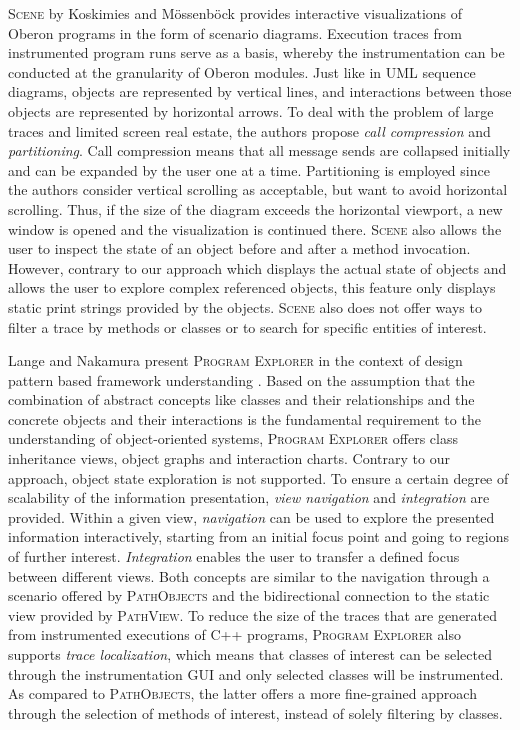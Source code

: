\textsc{Scene} by Koskimies and Mössenböck \cite{koskimies_scene:_1996} provides interactive visualizations of Oberon programs in the form of scenario diagrams.
Execution traces from instrumented program runs serve as a basis, whereby the instrumentation can be conducted at the granularity of Oberon modules.
Just like in UML sequence diagrams, objects are represented by vertical lines, and interactions between those objects are represented by horizontal arrows.
To deal with the problem of large traces and limited screen  real estate, the authors propose \emph{call compression} and \emph{partitioning}.
Call compression means that all message sends are collapsed initially and can be expanded by the user one at a time.
Partitioning is employed since the authors consider vertical scrolling as acceptable, but want to avoid horizontal scrolling. Thus, if the size of the diagram exceeds the horizontal viewport, a new window is opened and the visualization is continued there.
\textsc{Scene} also allows the user to inspect the state of an object before and after a method invocation.
However, contrary to our approach which displays the actual state of objects and allows the user to explore complex referenced objects, this feature only displays static print strings provided by the objects.
\textsc{Scene} also does not offer ways to filter a trace by methods or classes or to search for specific entities of interest.

Lange and Nakamura present \textsc{Program Explorer} in the context of design pattern based framework understanding \cite{lange_interactive_1995, lange_program_1995, lange_object-oriented_1997}.
Based on the assumption that the combination of abstract concepts like classes and their relationships and the concrete objects and their interactions is the fundamental requirement to the understanding of object-oriented systems, \textsc{Program Explorer} offers class inheritance views, object graphs and interaction charts.
Contrary to our approach, object state exploration is not supported.
To ensure a certain degree of scalability of the information presentation, \emph{view navigation} and \emph{integration} are provided.
Within a given view, \emph{navigation} can be used to explore the presented information interactively, starting from an initial focus point and going to regions of further interest.
\emph{Integration} enables the user to transfer a defined focus between different views.
Both concepts are similar to the navigation through a scenario offered by \textsc{PathObjects} and the bidirectional connection to the static view provided by \textsc{PathView}.
To reduce the size of the traces that are generated from instrumented executions of C++ programs, \textsc{Program Explorer} also supports \emph{trace localization}, which means that classes of interest can be selected through the instrumentation GUI and only selected classes will be instrumented.
As compared to \textsc{PathObjects}, the latter offers a more fine-grained approach through the selection of methods of interest, instead of solely filtering by classes.

